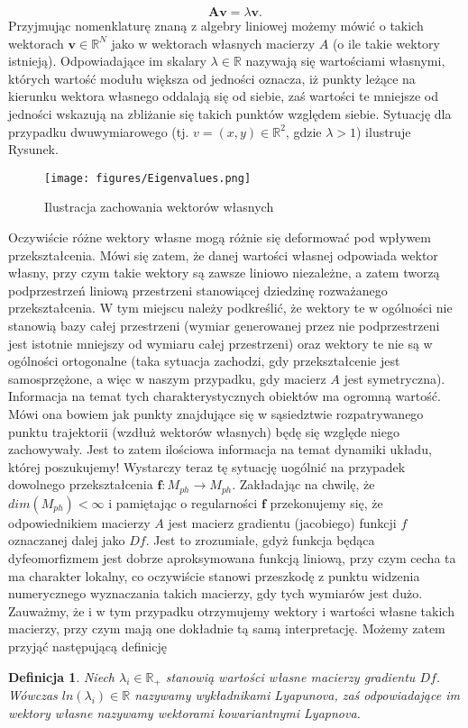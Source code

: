 \documentclass[12pt]{article}
\newtheorem{defi}{Definicja}
\begin{document}
\begin{equation}
	\textbf{A}\textbf{v} = \lambda \textbf{v}.
\end{equation}
Przyjmując nomenklaturę znaną z algebry liniowej możemy mówić o takich wektorach $ \textbf{v} \in \mathbb{R}^{N} $ jako w wektorach własnych macierzy $ A $ (o ile takie wektory istnieją). Odpowiadające im skalary $ \lambda \in \mathbb{R} $ nazywają się wartościami własnymi, których wartość modułu większa od jedności oznacza, iż punkty leżące na kierunku wektora własnego oddalają się od siebie, zaś wartości te mniejsze od jedności wskazują na zbliżanie się takich punktów względem siebie. Sytuację dla przypadku dwuwymiarowego (tj. $ v = (x,y) \in \mathbb{R}^2 $, gdzie $ \lambda > 1 $) ilustruje Rysunek.
\begin{figure}[H]
	\texttt{[image: figures/Eigenvalues.png]} 
	\centering
	\caption{Ilustracja zachowania wektorów własnych}
\end{figure}
Oczywiście różne wektory własne mogą różnie się deformować pod wpływem przekształcenia. Mówi się zatem, że danej wartości własnej odpowiada wektor własny, przy czym takie wektory są zawsze liniowo niezależne, a zatem tworzą podprzestrzeń liniową przestrzeni stanowiącej dziedzinę rozważanego przekształcenia. W tym miejscu należy podkreślić, że wektory te w ogólności nie stanowią bazy całej przestrzeni (wymiar generowanej przez nie podprzestrzeni jest istotnie mniejszy od wymiaru całej przestrzeni) oraz wektory te nie są w   ogólności ortogonalne (taka sytuacja zachodzi, gdy przekształcenie jest samosprzężone, a więc w naszym przypadku, gdy macierz $ A $ jest symetryczna). \newline
Informacja na temat tych charakterystycznych obiektów ma ogromną wartość. Mówi ona bowiem jak punkty znajdujące się w sąsiedztwie rozpatrywanego punktu trajektorii (wzdłuż wektorów własnych) będę się względe niego zachowywały. Jest to zatem ilościowa informacja na temat dynamiki układu, której poszukujemy! Wystarczy teraz tę sytuację uogólnić na przypadek dowolnego przekształcenia $ \textbf{f}: M_{ph} \rightarrow M_{ph}$. Zakładając na chwilę, że $ dim(M_{ph}) < \infty $ i pamiętając o regularności $ \textbf{f} $ przekonujemy się, że odpowiednikiem macierzy $ A $ jest macierz gradientu (jacobiego) funkcji $ f $ oznaczanej dalej jako $ Df $. Jest to zrozumiałe, gdyż funkcja będąca dyfeomorfizmem jest dobrze aproksymowana funkcją liniową, przy czym cecha ta ma charakter lokalny, co oczywiście stanowi przeszkodę z punktu widzenia numerycznego wyznaczania takich macierzy, gdy tych wymiarów jest dużo. Zauważmy, że i w tym przypadku otrzymujemy wektory i wartości własne takich macierzy, przy czym mają one dokładnie tą samą interpretację. Możemy zatem przyjąć następującą definicję
\begin{defi}
	Niech $ \lambda_{i} \in \mathbb{R}_{+} $ stanowią wartości własne macierzy gradientu $ Df $. Wówczas $ ln(\lambda_{i}) \in \mathbb{R} $ nazywamy wykładnikami Lyapunova, zaś odpowiadające im wektory własne nazywamy wektorami kowariantnymi Lyapnova.
\end{defi} 
\end{document}
